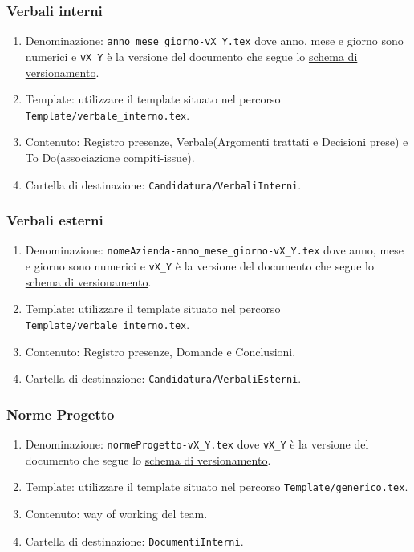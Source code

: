 \documentclass[a4paper, 12pt]{article}
\begin{document}
\subsubsection{Verbali interni}
\begin{enumerate}
    \item Denominazione: \lstinline|anno_mese_giorno-vX_Y.tex| dove anno, mese e giorno sono numerici e \lstinline|vX_Y| è la versione del documento che segue lo \hyperref[subsec:vers]{schema di versionamento}.
    
    \item Template: utilizzare il template situato nel percorso \lstinline|Template/verbale_interno.tex|.
    
    \item Contenuto: Registro presenze, Verbale(Argomenti trattati e Decisioni prese) e To Do(associazione compiti-issue).

    \item Cartella di destinazione: \lstinline|Candidatura/VerbaliInterni|.
\end{enumerate}

\subsubsection{Verbali esterni}
\begin{enumerate}
    \item Denominazione: \lstinline|nomeAzienda-anno_mese_giorno-vX_Y.tex| dove anno, mese e giorno sono numerici e \lstinline|vX_Y| è la versione del documento che segue lo \hyperref[subsec:vers]{schema di versionamento}.
    
    \item Template: utilizzare il template situato nel percorso \lstinline|Template/verbale_interno.tex|.
    
    \item Contenuto: Registro presenze, Domande e Conclusioni. 
    
    \item Cartella di destinazione: \lstinline|Candidatura/VerbaliEsterni|.
\end{enumerate}

\subsubsection{Norme Progetto}
\begin{enumerate}
    \item Denominazione: \lstinline|normeProgetto-vX_Y.tex| dove \lstinline|vX_Y| è la versione del documento che segue lo \hyperref[subsec:vers]{schema di versionamento}.
    
    \item Template: utilizzare il template situato nel percorso \lstinline|Template/generico.tex|.
    
    \item Contenuto: way of working del team.

    \item Cartella di destinazione: \lstinline|DocumentiInterni|.
\end{enumerate}
\end{document}
